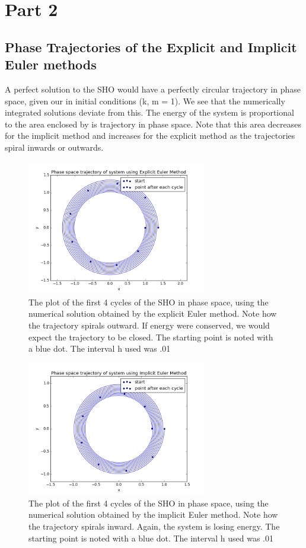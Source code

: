 \documentclass[a4paper]{article}
\begin{document}
\section{Part 2}
\subsection{Phase Trajectories of the Explicit and Implicit Euler methods}
A perfect solution to the SHO would have a perfectly circular trajectory in phase space, given our in initial conditions (k, m = 1). We see that the numerically integrated solutions deviate from this. The energy of the system is proportional to the area enclosed by is trajectory in phase space. Note that this area decreases for the implicit method and increases for the explicit method as the trajectories spiral inwards or outwards.

\begin{figure}[H]
\centering
\includegraphics[width=0.7\textwidth]{ph_e.png}
\caption{\label{fig:ph_e}The plot of the first 4 cycles of the SHO in phase space, using the numerical solution obtained by the explicit Euler method. Note how the trajectory spirals outward. If energy were conserved, we would expect the trajectory to be closed. The starting point is noted with a blue dot. The interval h used was .01}
\end{figure}

\begin{figure}[H]
\centering
\includegraphics[width=0.7\textwidth]{ph_i.png}
\caption{\label{fig:ph_i}The plot of the first 4 cycles of the SHO in phase space, using the numerical solution obtained by the implicit Euler method. Note how the trajectory spirals inward. Again, the system is losing energy. The starting point is noted with a blue dot. The interval h used was .01}
\end{figure}
\end{document}
